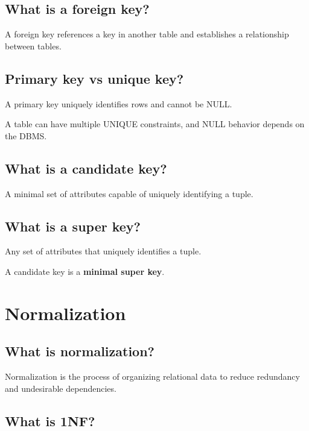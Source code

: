 \medskip

\subsection{What is a foreign key?}

A foreign key references a key in another table and establishes a relationship between tables.

\medskip

\subsection{Primary key vs unique key?}

A primary key uniquely identifies rows and cannot be NULL.

A table can have multiple UNIQUE constraints, and NULL behavior depends on the DBMS.

\medskip

\subsection{What is a candidate key?}

A minimal set of attributes capable of uniquely identifying a tuple.

\medskip

\subsection{What is a super key?}

Any set of attributes that uniquely identifies a tuple.

A candidate key is a \textbf{minimal super key}.

\medskip

\section{Normalization}

\subsection{What is normalization?}

Normalization is the process of organizing relational data to reduce redundancy and undesirable dependencies.

\medskip

\subsection{What is 1NF?}

